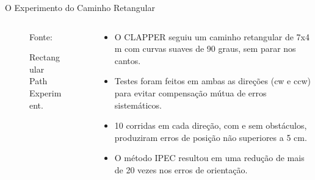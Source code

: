 \documentclass[xcolor=dvipsnames, aspectratio=169]{beamer}
\begin{document}
\begin{frame}{O Experimento do Caminho Retangular}
    \begin{columns}
      \begin{column}{0.5\textwidth}
        \begin{figure}
          \centering
          {Fonte: \cite{borenstein1995intemal}}
          \caption{Rectangular Path Experiment.}
          \label{fig:4_The_Rectangular_Path_Experiment}
        \end{figure}  
      \end{column}
  
      \begin{column}{0.5\textwidth}
        \begin{itemize}
          \item O CLAPPER seguiu um caminho retangular de 7x4 m com curvas suaves de 90 graus, sem parar nos cantos.
          \item Testes foram feitos em ambas as direções (cw e ccw) para evitar compensação mútua de erros sistemáticos.
          \item 10 corridas em cada direção, com e sem obstáculos, produziram erros de posição não superiores a 5 cm.
          \item O método IPEC resultou em uma redução de mais de 20 vezes nos erros de orientação.
        \end{itemize}      
      \end{column}
    \end{columns}
  \end{frame}
\end{document}

